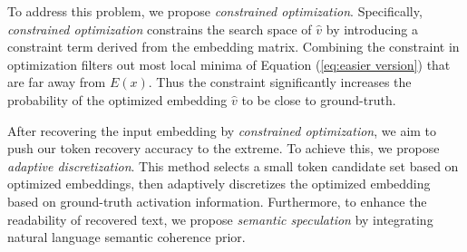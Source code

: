 To address this problem, we propose \textit{constrained optimization}. Specifically, \textit{constrained optimization} constrains the search space of $\hat{v}$ by introducing a constraint term derived from the embedding matrix. Combining the constraint in optimization filters out most local minima of Equation (\ref{eq:easier version}) that are far away from $E(x)$. Thus the constraint significantly increases the probability of the optimized embedding $\hat{v}$ to be close to ground-truth.

After recovering the input embedding by \textit{constrained optimization}, we aim to push our token recovery accuracy to the extreme. To achieve this, we propose \textit{adaptive discretization}. This method selects a small token candidate set based on optimized embeddings, then adaptively discretizes the optimized embedding based on ground-truth activation information.
Furthermore, to enhance the readability of recovered text, we propose 
 \textit{semantic speculation} by integrating natural language semantic coherence prior. 







